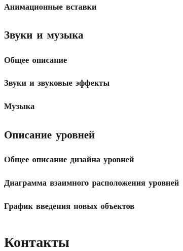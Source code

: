 \documentclass{article}
\begin{document}
\subsubsection{Анимационные вставки}
\subsection{Звуки и музыка}
\subsubsection{Общее описание}
\subsubsection{Звуки и звуковые эффекты}
\subsubsection{Музыка}
\subsection{Описание уровней}
\subsubsection{Общее описание дизайна уровней}
\subsubsection{Диаграмма взаимного расположения уровней}
\subsubsection{ График введения новых объектов}
\section{Контакты}


\end{document}
